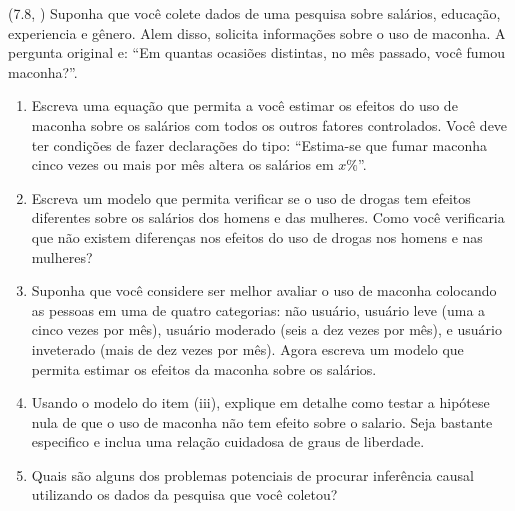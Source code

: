 \documentclass[12pt,letterpaper, onecolumn]{exam}
\begin{document}
\begin{questions}
\question\qstar (7.8, \citep{wooldridge2016}) Suponha que você colete dados de uma pesquisa sobre salários, educação, experiencia e gênero. Alem disso, solicita informações sobre o uso de maconha. A pergunta original e: ``Em quantas ocasiões distintas, no mês passado, você fumou maconha?''.
\begin{enumerate}[label=(\roman*)]
    \item Escreva uma equação que permita a você estimar os efeitos do uso de maconha sobre os salários com todos os outros fatores controlados. Você deve ter condições de fazer declarações do tipo: ``Estima-se que fumar maconha cinco vezes ou mais por mês altera os salários em \(x\%\)''.
    \item Escreva um modelo que permita verificar se o uso de drogas tem efeitos diferentes sobre os salários dos homens e das mulheres. Como você verificaria que não existem diferenças nos efeitos do uso de drogas nos homens e nas mulheres?
    \item Suponha que você considere ser melhor avaliar o uso de maconha colocando as pessoas em uma de quatro categorias: não usuário, usuário leve (uma a cinco vezes por mês), usuário moderado (seis a dez vezes por mês), e usuário inveterado (mais de dez vezes por mês). Agora escreva um modelo que permita estimar os efeitos da maconha sobre os salários.
    \item Usando o modelo do item (iii), explique em detalhe como testar a hipótese nula de que o uso de maconha não tem efeito sobre o salario. Seja bastante especifico e inclua uma relação cuidadosa de graus de liberdade.
    \item Quais são alguns dos problemas potenciais de procurar inferência causal utilizando os dados da pesquisa que você coletou?
\end{enumerate}

\vspace{0.7cm}


\end{questions}
\end{document}
